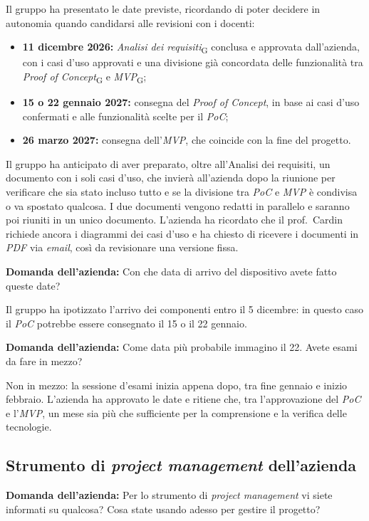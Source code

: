 \documentclass[12pt,a4paper]{article}
\newcommand{\gl}[1]{\emph{#1}\textsubscript{\scriptsize G}}
\newcommand{\tightlist}{\setlength{\itemsep}{1pt}\setlength{\parskip}{0pt}}
\begin{document}
Il gruppo ha presentato le date previste, ricordando di poter decidere in autonomia quando candidarsi alle revisioni con i docenti:
\begin{itemize}
\tightlist
\item \textbf{11 dicembre 2026:} \gl{Analisi dei requisiti} conclusa e approvata dall'azienda, con i casi d'uso approvati e una divisione già concordata delle funzionalità tra \gl{Proof of Concept} e \gl{MVP};
\item \textbf{15 o 22 gennaio 2027:} consegna del \emph{Proof of Concept}, in base ai casi d'uso confermati e alle funzionalità scelte per il \emph{PoC};
\item \textbf{26 marzo 2027:} consegna dell'\emph{MVP}, che coincide con la fine del progetto.
\end{itemize}

Il gruppo ha anticipato di aver preparato, oltre all'Analisi dei requisiti, un documento con i soli casi d'uso, che invierà all'azienda dopo la riunione per verificare che sia stato incluso tutto e se la divisione tra \emph{PoC} e \emph{MVP} è condivisa o va spostato qualcosa. I due documenti vengono redatti in parallelo e saranno poi riuniti in un unico documento. L'azienda ha ricordato che il prof.\ Cardin richiede ancora i diagrammi dei casi d'uso e ha chiesto di ricevere i documenti in \emph{PDF} via \emph{email}, così da revisionare una versione fissa.

\textbf{Domanda dell'azienda:} Con che data di arrivo del dispositivo avete fatto queste date?

Il gruppo ha ipotizzato l'arrivo dei componenti entro il 5 dicembre: in questo caso il \emph{PoC} potrebbe essere consegnato il 15 o il 22 gennaio.

\textbf{Domanda dell'azienda:} Come data più probabile immagino il 22. Avete esami da fare in mezzo?

Non in mezzo: la sessione d'esami inizia appena dopo, tra fine gennaio e inizio febbraio. L'azienda ha approvato le date e ritiene che, tra l'approvazione del \emph{PoC} e l'\emph{MVP}, un mese sia più che sufficiente per la comprensione e la verifica delle tecnologie.

\subsection{\texorpdfstring{Strumento di \emph{project management} dell'azienda}{Strumento di project management dell'azienda}}

\textbf{Domanda dell'azienda:} Per lo strumento di \emph{project management} vi siete informati su qualcosa? Cosa state usando adesso per gestire il progetto?
\end{document}
